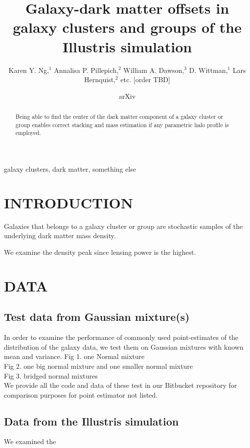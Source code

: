 \documentclass[letterpaper,useAMS,usenatbib]{mn2e}
\title[
	Galaxy-dark matter offsets in galaxy clusters and groups of the
Illustris simulation
]
{Galaxy-dark matter offsets in galaxy clusters and groups of the
Illustris simulation}
\author[Karen Y. Ng et al.]{Karen Y. Ng,$^{1}$
	Annalisa P. Pillepich,$^{2}$ 
	William A. Dawson,$^{3}$ 
	D. Wittman,$^{1}$
	\newauthor Lars Hernquist,$^{2}$
	etc. [order TBD]
}
\begin{document}
\date{arXiv} \pagerange{\pageref{firstpage}--\pageref{lastpage}}
 \maketitle\label{firstpage}
\begin{abstract} 
	Being able to find the center of the dark matter component of a galaxy cluster or
	group enables correct stacking and mass estimation if any parametric halo
	profile is employed. 
\end{abstract}
\begin{keywords}
	galaxy clusters, dark matter, something else 
\end{keywords}
\section{INTRODUCTION} 

Galaxies that belongs to a galaxy cluster or group are stochastic samples
of the underlying dark matter mass density. 

We examine the density peak since lensing power is the highest.
\section{DATA}
\subsection{Test data from Gaussian mixture(s)}
In order to examine the performance of commonly used point-estimates of the
distribution of the galaxy data, we test them on Gaussian mixtures with
known mean and variance.
Fig 1. one Normal mixture \\  
Fig 2. one big normal mixture and one smaller normal mixture \\ 
Fig 3. bridged normal mixtures \\  

We provide all the code and data of these test in our Bitbucket repository
for comparison purposes for point estimator not listed.

\subsection{Data from the Illustris simulation} 
We examined the 
\end{document}
